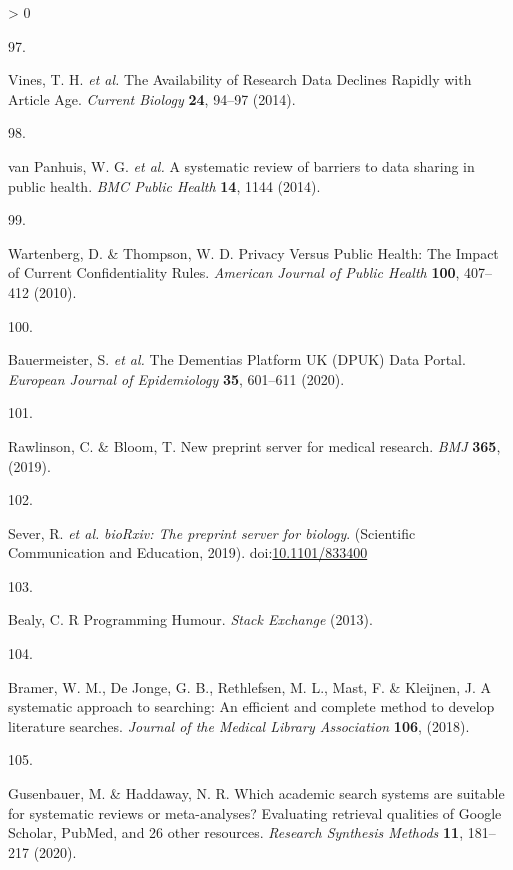 \documentclass[a4paper, twoside]{templates/ociamthesis}
\newlength{\cslhangindent}
\newlength{\csllabelwidth}
\newenvironment{CSLReferences}[3] %
 {%
  \setlength{\parindent}{0pt}
  \ifodd #1 \everypar{\setlength{\hangindent}{\cslhangindent}}\ignorespaces\fi
  \ifnum #2 > 0
  \setlength{\parskip}{#2\baselineskip}
  \fi
 }%
 {}
\newcommand{\CSLLeftMargin}[1]{\parbox[t]{\maxof{\widthof{#1}}{\csllabelwidth}}{#1}}
\newcommand{\CSLRightInline}[1]{\parbox[t]{\linewidth - \csllabelwidth}{#1}}
\begin{document}
\begin{CSLReferences}{0}{0}
\leavevmode\hypertarget{ref-vines2014}{}%
\CSLLeftMargin{97. }
\CSLRightInline{Vines, T. H. \emph{et al.} The {Availability} of {Research Data Declines Rapidly} with {Article Age}. \emph{Current Biology} \textbf{24}, 94--97 (2014).}

\leavevmode\hypertarget{ref-vanpanhuis2014}{}%
\CSLLeftMargin{98. }
\CSLRightInline{van Panhuis, W. G. \emph{et al.} A systematic review of barriers to data sharing in public health. \emph{BMC Public Health} \textbf{14}, 1144 (2014).}

\leavevmode\hypertarget{ref-wartenberg2010}{}%
\CSLLeftMargin{99. }
\CSLRightInline{Wartenberg, D. \& Thompson, W. D. Privacy {Versus Public Health}: The {Impact} of {Current Confidentiality Rules}. \emph{American Journal of Public Health} \textbf{100}, 407--412 (2010).}

\leavevmode\hypertarget{ref-bauermeister2020}{}%
\CSLLeftMargin{100. }
\CSLRightInline{Bauermeister, S. \emph{et al.} The {Dementias Platform UK} ({DPUK}) {Data Portal}. \emph{European Journal of Epidemiology} \textbf{35}, 601--611 (2020).}

\leavevmode\hypertarget{ref-rawlinson2019}{}%
\CSLLeftMargin{101. }
\CSLRightInline{Rawlinson, C. \& Bloom, T. New preprint server for medical research. \emph{BMJ} \textbf{365}, (2019).}

\leavevmode\hypertarget{ref-sever2019}{}%
\CSLLeftMargin{102. }
\CSLRightInline{Sever, R. \emph{et al.} \emph{{bioRxiv}: The preprint server for biology}. ({Scientific Communication and Education}, 2019). doi:\href{https://doi.org/10.1101/833400}{10.1101/833400}}

\leavevmode\hypertarget{ref-bealy2013}{}%
\CSLLeftMargin{103. }
\CSLRightInline{Bealy, C. R {Programming Humour}. \emph{Stack Exchange} (2013).}

\leavevmode\hypertarget{ref-bramer2018a}{}%
\CSLLeftMargin{104. }
\CSLRightInline{Bramer, W. M., De Jonge, G. B., Rethlefsen, M. L., Mast, F. \& Kleijnen, J. A systematic approach to searching: An efficient and complete method to develop literature searches. \emph{Journal of the Medical Library Association} \textbf{106}, (2018).}

\leavevmode\hypertarget{ref-gusenbauer2020}{}%
\CSLLeftMargin{105. }
\CSLRightInline{Gusenbauer, M. \& Haddaway, N. R. Which academic search systems are suitable for systematic reviews or meta-analyses? Evaluating retrieval qualities of {Google Scholar}, {PubMed}, and 26 other resources. \emph{Research Synthesis Methods} \textbf{11}, 181--217 (2020).}


\end{CSLReferences}
\end{document}
